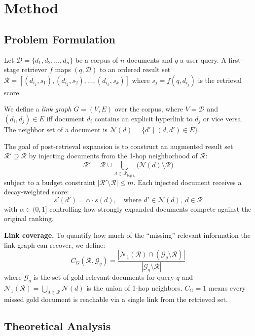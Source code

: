 \documentclass[sigconf,review]{acmart}
\begin{document}
\section{Method}
\label{sec:method}

\subsection*{Problem Formulation}
Let $\mathcal{D} = \{d_1, d_2, \ldots, d_n\}$ be a corpus of $n$ documents and
$q$ a user query. A first-stage retriever $f$ maps $(q, \mathcal{D})$ to an
ordered result set $\mathcal{R} = [(d_{i_1}, s_1), (d_{i_2}, s_2), \ldots,
(d_{i_k}, s_k)]$ where $s_j = f(q, d_{i_j})$ is the retrieval score.

We define a \emph{link graph} $G = (V, E)$ over the corpus, where $V = \mathcal{D}$
and $(d_i, d_j) \in E$ iff document $d_i$ contains an explicit hyperlink to $d_j$
or vice versa.  The neighbor set of a document is
$\mathcal{N}(d) = \{d' \mid (d, d') \in E\}$.

The goal of post-retrieval expansion is to construct an augmented result set
$\mathcal{R}' \supseteq \mathcal{R}$ by injecting documents from the 1-hop
neighborhood of $\mathcal{R}$:
\[
  \mathcal{R}' = \mathcal{R} \cup \bigcup_{d \in \mathcal{R}_{\text{top-}k}} \bigl(\mathcal{N}(d) \setminus \mathcal{R}\bigr)
\]
subject to a budget constraint $|\mathcal{R}' \setminus \mathcal{R}| \leq m$.
Each injected document receives a decay-weighted score:
\[
  s'(d') = \alpha \cdot s(d), \quad \text{where } d' \in \mathcal{N}(d),\ d \in \mathcal{R}
\]
with $\alpha \in (0, 1]$ controlling how strongly expanded documents compete
against the original ranking.

\textbf{Link coverage.}
To quantify how much of the ``missing'' relevant information the link graph
can recover, we define:
\[
  C_G(\mathcal{R}, \mathcal{G}_q) = \frac{|\mathcal{N}_1(\mathcal{R}) \cap (\mathcal{G}_q \setminus \mathcal{R})|}{|\mathcal{G}_q \setminus \mathcal{R}|}
\]
where $\mathcal{G}_q$ is the set of gold-relevant documents for query $q$ and
$\mathcal{N}_1(\mathcal{R}) = \bigcup_{d \in \mathcal{R}} \mathcal{N}(d)$ is the
union of 1-hop neighbors.  $C_G = 1$ means every missed gold document is
reachable via a single link from the retrieved set.

\subsection{Theoretical Analysis}
\label{sec:theory}
\end{document}
